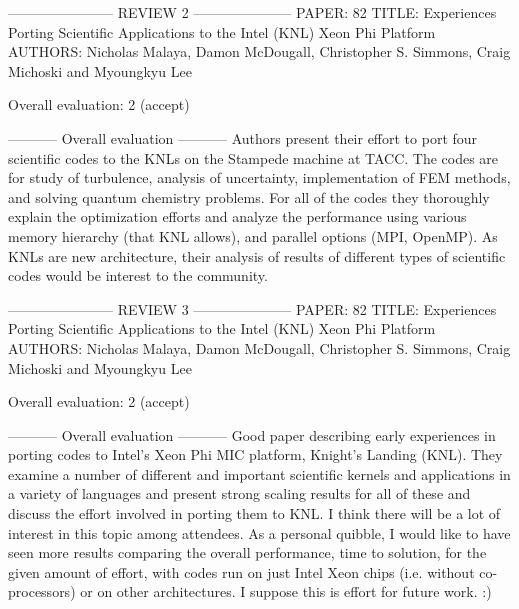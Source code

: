 ----------------------- REVIEW 2 ---------------------
PAPER: 82
TITLE: Experiences Porting Scientific Applications to the Intel (KNL)
Xeon Phi Platform
AUTHORS: Nicholas Malaya, Damon McDougall, Christopher S. Simmons, Craig
Michoski and Myoungkyu Lee

Overall evaluation: 2 (accept)

----------- Overall evaluation -----------
Authors present their effort to port four scientific codes to the KNLs
on the Stampede machine at TACC. The codes are for study of turbulence,
analysis of uncertainty, implementation of FEM methods, and solving
quantum chemistry problems. For all of the codes they thoroughly explain
the optimization efforts and analyze the performance using various
memory hierarchy (that KNL allows), and parallel options (MPI,
OpenMP). As KNLs are new architecture, their analysis of results of
different types of scientific codes would be interest to the community.


----------------------- REVIEW 3 ---------------------
PAPER: 82
TITLE: Experiences Porting Scientific Applications to the Intel (KNL)
Xeon Phi Platform
AUTHORS: Nicholas Malaya, Damon McDougall, Christopher S. Simmons, Craig
Michoski and Myoungkyu Lee

Overall evaluation: 2 (accept)

----------- Overall evaluation -----------
Good paper describing early experiences in porting codes to Intel’s Xeon
Phi MIC platform, Knight's Landing (KNL). They examine a number of
different and important scientific kernels and applications in a variety
of languages and present strong scaling results for all of these and
discuss the effort involved in porting them to KNL. I think there will
be a lot of interest in this topic among attendees. As a personal
quibble, I would like to have seen more results comparing the overall
performance, time to solution, for the given amount of effort, with
codes run on just Intel Xeon chips (i.e. without co-processors) or on
other architectures. I suppose this is effort for future work. :)